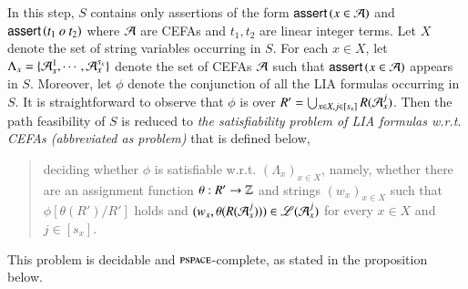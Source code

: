 \medskip
{}%

\smallskip

In this step, $S$ %
contains only assertions of the form $\textsf{assert}\left(x \in \mathcal{A}\right)$ and  $\textsf{assert}\left(t_1\ o\ t_2\right)$  where $\mathcal{A}$ are CEFAs and $t_1, t_2$ are linear integer terms. %
%
Let $X$ denote the set of string variables occurring in $S$.
For each $x \in X$, let $\Lambda_x=\{\mathcal{A}_{x}^1, \cdots, \mathcal{A}_{x}^{s_x}\}$ denote the set of CEFAs $\mathcal{A}$ such that $\textsf{assert}\left(x \in \mathcal{A}\right)$ appears in $S$. 
Moreover, let $\phi$ denote the conjunction of all the LIA formulas occurring in $S$. It is straightforward to observe that $\phi$ is over %
$R'=\bigcup_{x\in X, j \in [s_x]}R(\mathcal{A}_{x}^{j})$. Then the path feasibility of $S$ is reduced to \emph{the satisfiability problem of LIA formulas w.r.t. CEFAs (abbreviated as {\lasat} problem)} that is defined below, 
\begin{quote}
deciding whether $\phi$ is satisfiable w.r.t. $(\Lambda_x)_{x \in X}$, namely,  %
%	
whether %
there are an assignment function $\theta: R' \rightarrow \mathbb{Z}$ and strings $(w_x)_{x \in X}$ such that  $\phi[\theta(R')/R']$ holds and $(w_x, \theta(R(\mathcal{A}_{x}^{j}))) \in \mathscr{L}(\mathcal{A}_{x}^{j})$ for every $x \in X$ and $j \in [s_x]$.
\end{quote}
This {\lasat} problem is decidable and $\textsc{pspace}$-complete, as stated in the proposition below.

